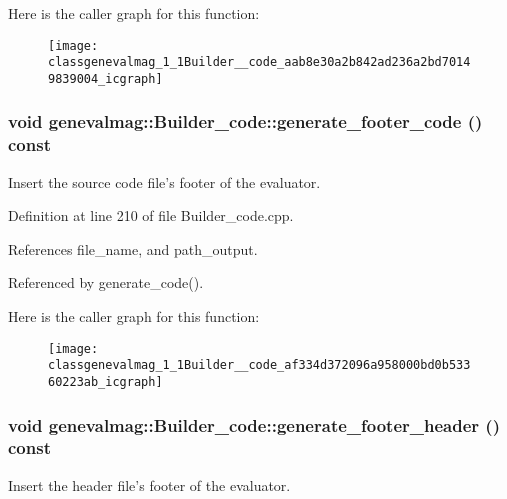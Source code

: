 Here is the caller graph for this function:\nopagebreak
\begin{figure}[H]
\begin{center}
\leavevmode
\texttt{[image: classgenevalmag\_1\_1Builder\_\_code\_aab8e30a2b842ad236a2bd70149839004\_icgraph]}
\end{center}
\end{figure}


\hypertarget{classgenevalmag_1_1Builder__code_af334d372096a958000bd0b53360223ab}{
\subsubsection[{generate\_\-footer\_\-code}]{\setlength{\rightskip}{0pt plus 5cm}void genevalmag::Builder\_\-code::generate\_\-footer\_\-code () const}}
\label{classgenevalmag_1_1Builder__code_af334d372096a958000bd0b53360223ab}
Insert the source code file's footer of the evaluator. 

Definition at line 210 of file Builder\_\-code.cpp.



References file\_\-name, and path\_\-output.



Referenced by generate\_\-code().



Here is the caller graph for this function:\nopagebreak
\begin{figure}[H]
\begin{center}
\leavevmode
\texttt{[image: classgenevalmag\_1\_1Builder\_\_code\_af334d372096a958000bd0b53360223ab\_icgraph]}
\end{center}
\end{figure}


\hypertarget{classgenevalmag_1_1Builder__code_a5f3ad7619822680e0f2a79d7c26af776}{
\subsubsection[{generate\_\-footer\_\-header}]{\setlength{\rightskip}{0pt plus 5cm}void genevalmag::Builder\_\-code::generate\_\-footer\_\-header () const}}
\label{classgenevalmag_1_1Builder__code_a5f3ad7619822680e0f2a79d7c26af776}
Insert the header file's footer of the evaluator. 

